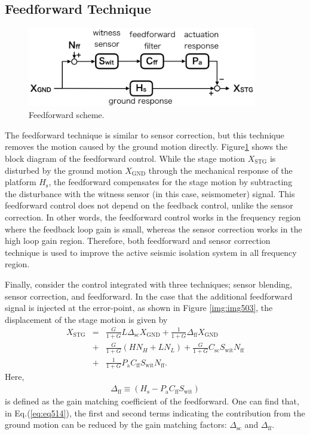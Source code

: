 \subsection{Feedforward Technique}
\begin{figure}[h]
  \begin{center}   
    \includegraphics[width=10cm]{./img_chap5/img506.png}
    \caption{Feedforward scheme.} \label{img:img506}
  \end{center}
\end{figure}
The feedforward technique is similar to sensor correction, but this technique removes the motion caused by the ground motion directly. Figure\ref{img:img506} shows the block diagram of the feedforward control. While the stage motion $X_{\mathrm{STG}}$ is disturbed by the ground motion $X_{\mathrm{GND}}$ through the mechanical response of the platform $H_{\mathrm{s}}$, the feedforward compensates for the stage motion by subtracting the disturbance with the witness sensor (in this case, seismometer) signal. This feedforward control does not depend on the feedback control, unlike the sensor correction. In other words, the feedforward control works in the frequency region where the feedback loop gain is small, whereas the sensor correction works in the high loop gain region. Therefore, both feedforward and sensor correction technique is used to improve the active seismic isolation system in all frequency region.

Finally, consider the control integrated with three techniques; sensor blending, sensor correction, and feedforward. In the case that the additional feedforward signal is injected at the error-point, as shown in Figure \ref{img:img503}, the displacement of the stage motion is given by
\begin{eqnarray}\nonumber
  X_{\mathrm{STG}} &=&\frac{G}{1+G}L\Delta_{\mathrm{sc}} X_{\mathrm{GND}} + \frac{1}{1+G} \Delta_{\mathrm{ff}} X_{\mathrm{GND}}\\ \nonumber
  &+& \frac{G}{1+G}\left(HN_{H}+LN_{L}\right) + \frac{G}{1+G}C_{\mathrm{sc}}S_{\mathrm{wit}}N_{\mathrm{ff}} \\ 
  &+& \frac{1}{1+G}P_{\mathrm{a}} C_{\mathrm{ff}}S_{\mathrm{wit}}N_{\mathrm{ff}} \label{eq:eq514}.
\end{eqnarray}
Here, 
\begin{eqnarray}
  \Delta_{\mathrm{ff}} \equiv \left(H_{\mathrm{s}}-P_{\mathrm{a}}C_{\mathrm{ff}}S_{\mathrm{wit}}\right) \label{eq:eq515}
\end{eqnarray}
is defined as the gain matching coefficient of the feedforward. One can find that, in  Eq.(\ref{eq:eq514}),  the first and second terms indicating the contribution from the ground motion can be reduced by the gain matching factors: $\Delta_{\mathrm{sc}}$ and $\Delta_{\mathrm{ff}}$. 

